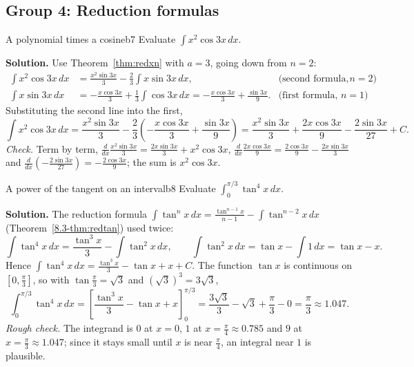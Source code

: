 \documentclass[11pt]{article}
\begin{document}
\subsection*{Group 4: Reduction formulas}

\begin{exmp}{A polynomial times a cosine}{b7}
Evaluate $\displaystyle\int x^2\cos3x\,dx$.

\textbf{Solution.} Use Theorem~\ref{thm:redxn} with $a=3$, going down from $n=2$:
\begin{align*}
\int x^2\cos3x\,dx&=\frac{x^2\sin3x}3-\frac23\int x\sin3x\,dx, &\text{(second formula, $n=2$)}\\
\int x\sin3x\,dx&=-\frac{x\cos3x}3+\frac13\int\cos3x\,dx=-\frac{x\cos3x}3+\frac{\sin3x}9. &\text{(first formula, $n=1$)}
\end{align*}
Substituting the second line into the first,
\[\int x^2\cos3x\,dx=\frac{x^2\sin3x}3-\frac23\left(-\frac{x\cos3x}3+\frac{\sin3x}9\right)=\frac{x^2\sin3x}3+\frac{2x\cos3x}9-\frac{2\sin3x}{27}+C .\]
\emph{Check.} Term by term, $\frac d{dx}\frac{x^2\sin3x}3=\frac{2x\sin3x}3+x^2\cos3x$, $\frac d{dx}\frac{2x\cos3x}9=\frac{2\cos3x}9-\frac{2x\sin3x}3$ and $\frac d{dx}\left(-\frac{2\sin3x}{27}\right)=-\frac{2\cos3x}9$; the sum is $x^2\cos3x$.
\end{exmp}

\begin{exmp}{A power of the tangent on an interval}{b8}
Evaluate $\displaystyle\int_0^{\pi/3}\tan^4x\,dx$.

\textbf{Solution.} The reduction formula $\int\tan^nx\,dx=\frac{\tan^{n-1}x}{n-1}-\int\tan^{n-2}x\,dx$ (Theorem~\ref{8.3-thm:redtan}) used twice:
\[\int\tan^4x\,dx=\frac{\tan^3x}3-\int\tan^2x\,dx,\qquad\int\tan^2x\,dx=\tan x-\int1\,dx=\tan x-x .\]
Hence $\int\tan^4x\,dx=\frac{\tan^3x}3-\tan x+x+C$. The function $\tan x$ is continuous on $\left[0,\frac\pi3\right]$, so with $\tan\frac\pi3=\sqrt3$ and $\left(\sqrt3\right)^3=3\sqrt3$,
\[\int_0^{\pi/3}\tan^4x\,dx=\left[\frac{\tan^3x}3-\tan x+x\right]_0^{\pi/3}=\frac{3\sqrt3}3-\sqrt3+\frac\pi3-0=\frac\pi3\approx1.047 .\]
\emph{Rough check.} The integrand is $0$ at $x=0$, $1$ at $x=\frac\pi4\approx0.785$ and $9$ at $x=\frac\pi3\approx1.047$; since it stays small until $x$ is near $\frac\pi4$, an integral near $1$ is plausible.
\end{exmp}
\end{document}
